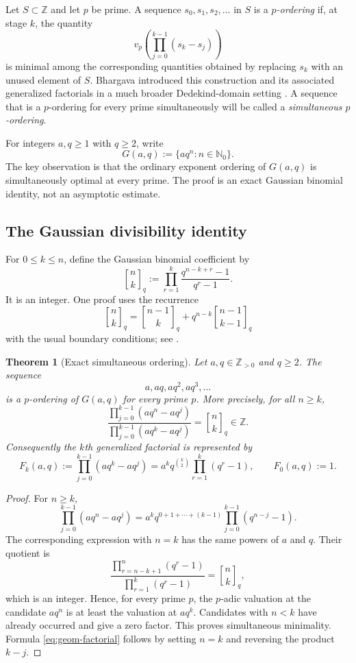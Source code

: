 \documentclass[11pt]{article}
\newtheorem{theorem}{Theorem}[section]
\theoremstyle{definition}
\theoremstyle{remark}
\newcommand{\N}{\mathbb N}
\newcommand{\Z}{\mathbb Z}
\newcommand{\qbinom}[3]{\genfrac{[}{]}{0pt}{}{#1}{#2}_{#3}}
\begin{document}
Let $S\subset\Z$ and let $p$ be prime.  A sequence
$s_0,s_1,s_2,\ldots$ in $S$ is a \emph{$p$-ordering} if, at stage $k$, the
quantity
\[
 v_p\!\left(\prod_{j=0}^{k-1}(s_k-s_j)\right)
\]
is minimal among the corresponding quantities obtained by replacing $s_k$
with an unused element of $S$.  Bhargava introduced this construction and
its associated generalized factorials in a much broader Dedekind-domain
setting \cite{Bhargava1997,Bhargava2000}.  A sequence that is a $p$-ordering
for every prime simultaneously will be called a \emph{simultaneous
$p$-ordering}.

For integers $a,q\geq1$ with $q\geq2$, write
\[
 G(a,q):=\{a q^n:n\in\N_0\}.
\]
The key observation is that the ordinary exponent ordering of $G(a,q)$ is
simultaneously optimal at every prime.  The proof is an exact Gaussian
binomial identity, not an asymptotic estimate.

\subsection{The Gaussian divisibility identity}

For $0\leq k\leq n$, define the Gaussian binomial coefficient by
\begin{equation}\label{eq:qbinom}
 \qbinom{n}{k}{q}
 :=\prod_{r=1}^{k}\frac{q^{n-k+r}-1}{q^r-1}.
\end{equation}
It is an integer.  One proof uses the recurrence
\[
 \qbinom{n}{k}{q}
 =\qbinom{n-1}{k}{q}+q^{n-k}\qbinom{n-1}{k-1}{q}
\]
with the usual boundary conditions; see \cite[Ch.~3]{Andrews1976}.

\begin{theorem}[Exact simultaneous ordering]\label{thm:simultaneous-ordering}
Let $a,q\in\Z_{>0}$ and $q\geq2$.  The sequence
\[
 a,aq,aq^2,aq^3,\ldots
\]
is a $p$-ordering of $G(a,q)$ for every prime $p$.  More precisely, for all
$n\geq k$,
\begin{equation}\label{eq:ratio-qbinom}
 \frac{\displaystyle\prod_{j=0}^{k-1}(aq^n-aq^j)}
      {\displaystyle\prod_{j=0}^{k-1}(aq^k-aq^j)}
 =\qbinom{n}{k}{q}\in\Z.
\end{equation}
Consequently the $k$th generalized factorial is represented by
\begin{equation}\label{eq:geom-factorial}
 F_k(a,q):=\prod_{j=0}^{k-1}(aq^k-aq^j)
 =a^kq^{\binom{k}{2}}\prod_{r=1}^{k}(q^r-1),
 \qquad F_0(a,q):=1.
\end{equation}
\end{theorem}

\begin{proof}
For $n\geq k$,
\[
 \prod_{j=0}^{k-1}(aq^n-aq^j)
 =a^kq^{0+1+\cdots+(k-1)}
   \prod_{j=0}^{k-1}(q^{n-j}-1).
\]
The corresponding expression with $n=k$ has the same powers of $a$ and $q$.
Their quotient is
\[
 \frac{\prod_{r=n-k+1}^{n}(q^r-1)}
      {\prod_{r=1}^{k}(q^r-1)}
 =\qbinom{n}{k}{q},
\]
which is an integer.  Hence, for every prime $p$, the $p$-adic valuation at
the candidate $aq^n$ is at least the valuation at $aq^k$.  Candidates with
$n<k$ have already occurred and give a zero factor.  This proves simultaneous
minimality.  Formula \eqref{eq:geom-factorial} follows by setting $n=k$ and
reversing the product $k-j$.
\end{proof}
\end{document}
